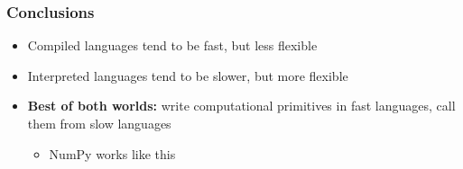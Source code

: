 \documentclass[rgb,dvipsnames,aspectratio=169,xcolor=table]{beamer}
\begin{document}
\begin{frame}
  \frametitle{Conclusions}

  \begin{itemize}
  \item Compiled languages tend to be fast, but less flexible
  \item Interpreted languages tend to be slower, but more flexible
  \item \textbf{Best of both worlds:} write computational primitives
    in fast languages, call them from slow languages
    \begin{itemize}
    \item NumPy works like this
    \end{itemize}
  \end{itemize}

\end{frame}
\end{document}
